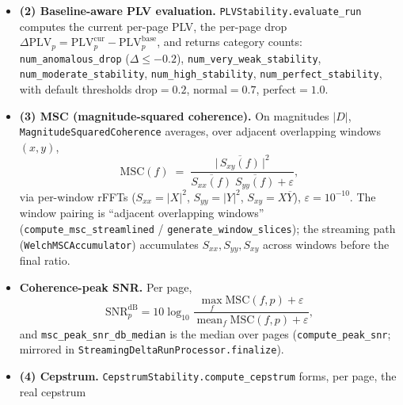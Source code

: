 \documentclass[conference]{IEEEtran}
\begin{document}
\begin{itemize}
        For the idle (\texttt{--is-baseline}) step this vector is saved to
        \texttt{baseline\_plv.npy} and reused by all other steps.
  \item \textbf{(2) Baseline-aware PLV evaluation.}
        \texttt{PLVStability.evaluate\_run} computes the current per-page PLV,
        the per-page drop $\Delta\mathrm{PLV}_p = \mathrm{PLV}^{\text{cur}}_p -
        \mathrm{PLV}^{\text{base}}_p$, and returns category counts:
        \texttt{num\_anomalous\_drop} ($\Delta \le -0.2$),
        \texttt{num\_very\_weak\_stability}, \texttt{num\_moderate\_stability},
        \texttt{num\_high\_stability}, \texttt{num\_perfect\_stability}, with
        default thresholds drop$=0.2$, normal$=0.7$, perfect$=1.0$.
  \item \textbf{(3) MSC (magnitude-squared coherence).} On magnitudes
        $|D|$, \texttt{MagnitudeSquaredCoherence} averages, over adjacent
        overlapping windows $(x,y)$,
        \[
          \mathrm{MSC}(f) \;=\;
          \frac{\bigl|\,\overline{S_{xy}(f)}\,\bigr|^{2}}
               {\overline{S_{xx}(f)}\;\overline{S_{yy}(f)} + \varepsilon},
        \]
        via per-window rFFTs ($S_{xx}=|X|^2$, $S_{yy}=|Y|^2$,
        $S_{xy}=X\overline{Y}$), $\varepsilon=10^{-10}$. The window pairing is
        ``adjacent overlapping windows'' (\texttt{compute\_msc\_streamlined} /
        \texttt{generate\_window\_slices}); the streaming path
        (\texttt{WelchMSCAccumulator}) accumulates $S_{xx},S_{yy},S_{xy}$ across
        windows before the final ratio.
  \item \textbf{Coherence-peak SNR.} Per page,
        \[
          \mathrm{SNR}_p^{\mathrm{dB}} = 10\log_{10}\!
          \frac{\max_f \mathrm{MSC}(f,p) + \varepsilon}
               {\operatorname{mean}_f \mathrm{MSC}(f,p) + \varepsilon},
        \]
        and \texttt{msc\_peak\_snr\_db\_median} is the median over pages
        (\texttt{compute\_peak\_snr}; mirrored in
        \texttt{StreamingDeltaRunProcessor.finalize}).
  \item \textbf{(4) Cepstrum.} \texttt{CepstrumStability.compute\_cepstrum}
        forms, per page, the real cepstrum

\end{itemize}
\end{document}

